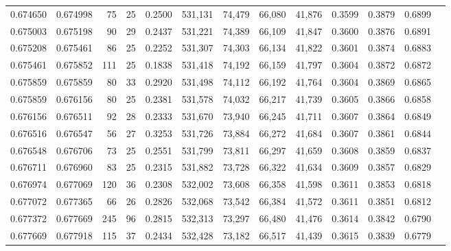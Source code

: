 \begin{tabular}{rrrrrrrrrrrrr}
0.674650 & 0.674998 &    75 &  25 &                                     0.2500 & 531,131 &  74,479 &  66,080 &  41,876 & 0.3599 & 0.3879 & 0.6899 \\
0.675003 & 0.675198 &    90 &  29 &                                     0.2437 & 531,221 &  74,389 &  66,109 &  41,847 & 0.3600 & 0.3876 & 0.6891 \\
0.675208 & 0.675461 &    86 &  25 &                                     0.2252 & 531,307 &  74,303 &  66,134 &  41,822 & 0.3601 & 0.3874 & 0.6883 \\
0.675461 & 0.675852 &   111 &  25 &                                     0.1838 & 531,418 &  74,192 &  66,159 &  41,797 & 0.3604 & 0.3872 & 0.6872 \\
0.675859 & 0.675859 &    80 &  33 &                                     0.2920 & 531,498 &  74,112 &  66,192 &  41,764 & 0.3604 & 0.3869 & 0.6865 \\
0.675859 & 0.676156 &    80 &  25 &                                     0.2381 & 531,578 &  74,032 &  66,217 &  41,739 & 0.3605 & 0.3866 & 0.6858 \\
0.676156 & 0.676511 &    92 &  28 &                                     0.2333 & 531,670 &  73,940 &  66,245 &  41,711 & 0.3607 & 0.3864 & 0.6849 \\
0.676516 & 0.676547 &    56 &  27 &                                     0.3253 & 531,726 &  73,884 &  66,272 &  41,684 & 0.3607 & 0.3861 & 0.6844 \\
0.676548 & 0.676706 &    73 &  25 &                                     0.2551 & 531,799 &  73,811 &  66,297 &  41,659 & 0.3608 & 0.3859 & 0.6837 \\
0.676711 & 0.676960 &    83 &  25 &                                     0.2315 & 531,882 &  73,728 &  66,322 &  41,634 & 0.3609 & 0.3857 & 0.6829 \\
0.676974 & 0.677069 &   120 &  36 &                                     0.2308 & 532,002 &  73,608 &  66,358 &  41,598 & 0.3611 & 0.3853 & 0.6818 \\
0.677072 & 0.677365 &    66 &  26 &                                     0.2826 & 532,068 &  73,542 &  66,384 &  41,572 & 0.3611 & 0.3851 & 0.6812 \\
0.677372 & 0.677669 &   245 &  96 &                                     0.2815 & 532,313 &  73,297 &  66,480 &  41,476 & 0.3614 & 0.3842 & 0.6790 \\
0.677669 & 0.677918 &   115 &  37 &                                     0.2434 & 532,428 &  73,182 &  66,517 &  41,439 & 0.3615 & 0.3839 & 0.6779 \\

\end{tabular}
